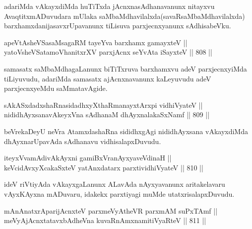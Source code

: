 \begin{artha}
adariMda vAkayxdiMda huTiTxda jAcnxnasAdhanavanunx nitayxvu AvaqtitxmADuvudara mUlaka saMbaMdhavilalxda(savaRsaMbaMdhavilalxda) barxhamxdanijasavxrUpavanunx tiLisuva parxjecnxyanunx sAdhisabeVku.
\end{artha}

\begin{shl}
apeVtAsheVSasaMsagaRM tayeYva barxhamx gamayxteV || \\
yatoV\s sheVSatamoVhanitxrXV parxjAcnx seYvAta iSayxteV \hfill || 808 ||  
\end{shl}

\begin{artha}
samasatx saMbaMdhagaLanunx biTiTxruva barxhamxvu adeV parxjecnxyiMda tiLiyuvudu, adariMda samasatx ajAcnxnavanunx kaLeyuvudu adeV parxjecnxyeMdu saMmatavAgide.
\end{artha}


\begin{shl}
sAkASxdadxshaRnasidadhxyXthaRmanayxtArxpi vidhiVyateV || \\
nididhAyxsanavAkeyxVna sAdhanaM dhAyxnalakaSxNamf \hfill || 809 ||  
\end{shl}

\begin{artha}
beVrekaDeyU neVra AtamxdashaRna sididhxgAgi nididhAyxsana vAkayxdiMda dhAyxnarUpavAda sAdhanavu vidhisalapxDuvudu.
\end{artha}

\begin{shl}
iteyxVvamAdivAkAyxni gamiBxVranAyxyaveVdinaH || \\
keVcidAvxyXcakaSxteV yatAnxdatarx parxtividhiVyateV \hfill || 810 ||  
\end{shl}

\begin{artha}
ideV riVtiyAda vAkayxgaLanunx ALavAda nAyxyavanunx aritakelavaru vAyxKAyxna mADuvaru, idakekx parxtiyagi muMde utatxrisalapxDuvudu.
\end{artha}


\begin{shl}
mAnAnatxrAparijAcnxteV parxmeVyAtheVR parxmAM suPxTAmf || \\
meVyAjAcnxtatavxbAdheVna kuvaRnAmxnamitiVyaRteV \hfill || 811 ||  
\end{shl}

